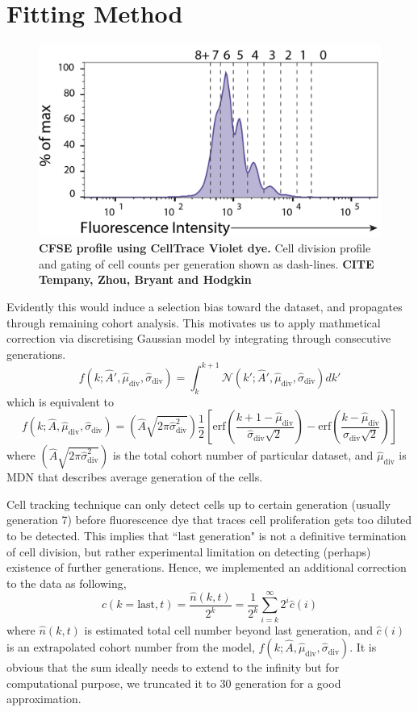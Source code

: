 \documentclass{article}
\newcommand{\enterProblemHeader}[1]{
}
\newcommand{\exitProblemHeader}[1]{
}
\newcounter{homeworkProblemCounter} %
\newcommand{\homeworkProblemName}{}
\newenvironment{homeworkProblem}[1][Problem \arabic{homeworkProblemCounter}]{ %
\stepcounter{homeworkProblemCounter} %
\renewcommand{\homeworkProblemName}{#1} %
\section{\homeworkProblemName} %
\enterProblemHeader{\homeworkProblemName} %
}{
\exitProblemHeader{\homeworkProblemName} %
}
\newcommand{\erf}{\mathrm{erf}}
\newcommand{\N}{\mathcal{N}}
\newcommand{\A}{\hat{A}}
\newcommand{\MU}{\hat{\mu}}
\newcommand{\SIGMA}{\hat{\sigma}}
\begin{document}
\begin{homeworkProblem}[Fitting Method]
\begin{figure}
    \includegraphics[scale=1.3]{./img/CTVgating.png}
    \caption{\textbf{CFSE profile using CellTrace Violet dye.} Cell division profile and gating of cell counts per generation shown as dash-lines. \textbf{CITE Tempany, Zhou, Bryant and Hodgkin}}
    \label{fig:cfseProfile}
\end{figure}
Evidently this would induce a selection bias toward the dataset, and propagates through remaining cohort analysis. This motivates us to apply mathmetical correction via discretising Gaussian model by integrating through consecutive generations.
\begin{equation}
    f(k;\A',\MU_{\mathrm{div}},\SIGMA_{\mathrm{div}}) = \int_{k}^{k+1} \N (k';\A',\MU_{\mathrm{div}},\SIGMA_{\mathrm{div}}) dk'
\end{equation}
which is equivalent to
\begin{equation}
    f(k;\A,\MU_{\mathrm{div}},\SIGMA_{\mathrm{div}}) = \left(\A\sqrt{2\pi\SIGMA_{\mathrm{div}}^2}\right)\frac{1}{2}\left[\erf\left(\frac{k+1-\MU_{\mathrm{div}}}{\SIGMA_{\mathrm{div}}\sqrt{2}}\right) - \erf\left(\frac{k-\MU_{\mathrm{div}}}{\SIGMA_{\mathrm{div}}\sqrt{2}}\right)\right]
    \label{eq:discrete_gaussian_model}
\end{equation}
where $\left(\A \sqrt{2\pi\SIGMA^2_{\mathrm{div}}}\right)$ is the total cohort number of particular dataset, and $\MU_{\mathrm{div}}$ is MDN that describes average generation of the cells.

Cell tracking technique can only detect cells up to certain generation (usually generation 7) before fluorescence dye that traces cell proliferation gets too diluted to be detected. This implies that ``last generation" is not a definitive termination of cell division, but rather experimental limitation on detecting (perhaps) existence of further generations. Hence, we implemented an additional correction to the data as following,
\begin{equation}
    c(k=\mathrm{last}, t) = \frac{\hat{n}(k,t)}{2^k} = \frac{1}{2^k}\sum_{i=k}^{\infty} 2^i \hat{c}(i)
\end{equation}
where $\hat{n}(k,t)$ is estimated total cell number beyond last generation, and $\hat{c}(i)$ is an extrapolated cohort number from the model, $f(k;\A,\MU_{\mathrm{div}},\SIGMA_{\mathrm{div}})$. It is obvious that the sum ideally needs to extend to the infinity but for computational purpose, we truncated it to 30 generation for a good approximation.


\end{homeworkProblem}
\end{document}

